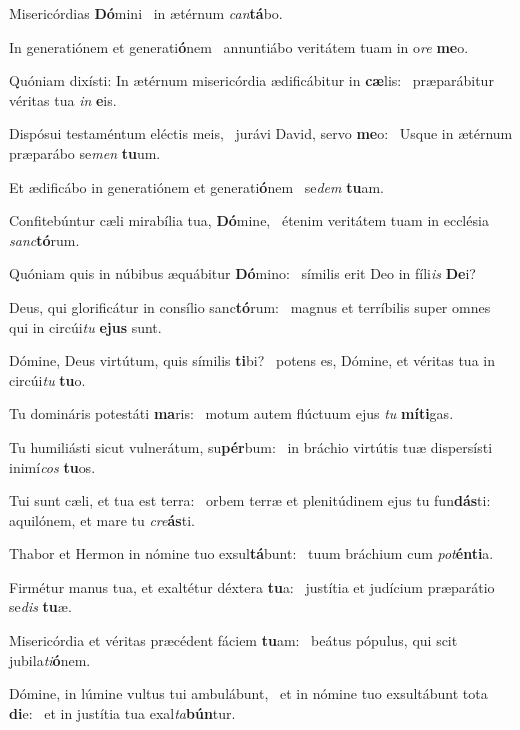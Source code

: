 \item Misericórdias \textbf{Dó}mini~\psstar{} in ætérnum \textit{can}\textbf{tá}bo.
\item In generatiónem et generati\textbf{ó}nem~\psstar{} annuntiábo veritátem tuam in o\textit{re} \textbf{me}o.
\item Quóniam dixísti: In ætérnum misericórdia ædificábitur in \textbf{cæ}lis:~\psstar{} præparábitur véritas tua \textit{in} \textbf{e}is.
\item Dispósui testaméntum eléctis meis,~\pscross{} jurávi David, servo \textbf{me}o:~\psstar{} Usque in ætérnum præparábo se\textit{men} \textbf{tu}um.
\item Et ædificábo in generatiónem et generati\textbf{ó}nem~\psstar{} se\textit{dem} \textbf{tu}am.
\item Confitebúntur cæli mirabília tua, \textbf{Dó}mine,~\psstar{} étenim veritátem tuam in ecclésia \textit{sanc}\textbf{tó}rum.
\item Quóniam quis in núbibus æquábitur \textbf{Dó}mino:~\psstar{} símilis erit Deo in fíli\textit{is} \textbf{De}i?
\item Deus, qui glorificátur in consílio sanc\textbf{tó}rum:~\psstar{} magnus et terríbilis super omnes qui in circúi\textit{tu} \textbf{e}\textbf{jus} sunt.
\item Dómine, Deus virtútum, quis símilis \textbf{ti}bi?~\psstar{} potens es, Dómine, et véritas tua in circúi\textit{tu} \textbf{tu}o.
\item Tu domináris potestáti \textbf{ma}ris:~\psstar{} motum autem flúctuum ejus \textit{tu} \textbf{mí}\textbf{ti}gas.
\item Tu humiliásti sicut vulnerátum, su\textbf{pér}bum:~\psstar{} in bráchio virtútis tuæ dispersísti inimí\textit{cos} \textbf{tu}os.
\item Tui sunt cæli, et tua est terra:~\pscross{} orbem terræ et plenitúdinem ejus tu fun\textbf{dás}ti:~\psstar{} aquilónem, et mare tu \textit{cre}\textbf{ás}ti.
\item Thabor et Hermon in nómine tuo exsul\textbf{tá}bunt:~\psstar{} tuum bráchium cum \textit{pot}\textbf{én}\textbf{ti}a.
\item Firmétur manus tua, et exaltétur déxtera \textbf{tu}a:~\psstar{} justítia et judícium præparátio se\textit{dis} \textbf{tu}æ.
\item Misericórdia et véritas præcédent fáciem \textbf{tu}am:~\psstar{} beátus pópulus, qui scit jubila\textit{ti}\textbf{ó}nem.
\item Dómine, in lúmine vultus tui ambulábunt,~\pscross{} et in nómine tuo exsultábunt tota \textbf{di}e:~\psstar{} et in justítia tua exal\textit{ta}\textbf{bún}tur.

